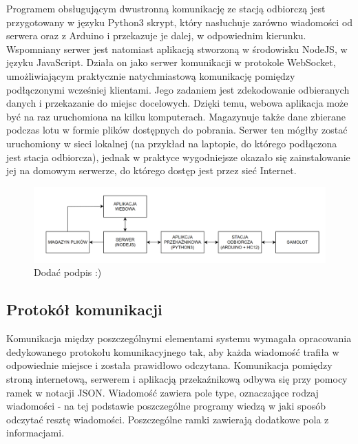 \documentclass[12pt, a4paper]{article}
\begin{document}
Programem obsługującym dwustronną komunikację ze stacją odbiorczą jest przygotowany w języku Python3 skrypt, który nasłuchuje zarówno wiadomości od serwera oraz z Arduino i przekazuje je dalej, w odpowiednim kierunku. Wspomniany serwer jest natomiast aplikacją stworzoną w środowisku NodeJS, w języku JavaScript. Działa on jako serwer komunikacji w protokole WebSocket, umożliwiającym praktycznie natychmiastową komunikację pomiędzy podłączonymi wcześniej klientami. Jego zadaniem jest zdekodowanie odbieranych danych i przekazanie do miejsc docelowych. Dzięki temu, webowa aplikacja może być na raz uruchomiona na kilku komputerach. Magazynuje także dane zbierane podczas lotu w formie plików dostępnych do pobrania. Serwer ten mógłby zostać uruchomiony w sieci lokalnej (na przykład na laptopie, do którego podłączona jest stacja odbiorcza), jednak w praktyce wygodniejsze okazało się zainstalowanie jej na domowym serwerze, do którego dostęp jest przez sieć Internet.
 \begin{figure}[ht]
    \centering
    \includegraphics[width=1\textwidth]{diagram_env}
    \caption{Dodać podpis :)}
\end{figure}

\FloatBarrier
\subsection{Protokół komunikacji}
Komunikacja między poszczególnymi elementami systemu wymagała opracowania dedykowanego protokołu komunikacyjnego tak, aby każda wiadomość trafiła w odpowiednie miejsce i została prawidłowo odczytana. 
Komunikacja pomiędzy stroną internetową, serwerem i aplikacją przekaźnikową odbywa się przy pomocy ramek w notacji JSON. Wiadomość zawiera pole type, oznaczające rodzaj wiadomości - na tej podstawie poszczególne programy wiedzą w jaki sposób odczytać resztę wiadomości. Poszczególne ramki zawierają dodatkowe pola z informacjami. 
\end{document}
